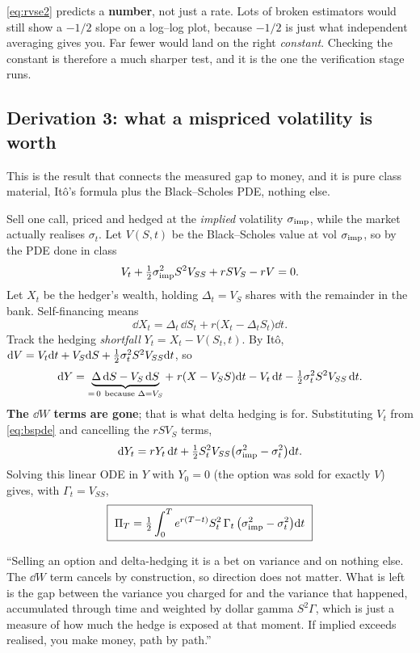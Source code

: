\documentclass[11pt,a4paper]{article}
\begin{document}
\begin{keybox}
\eqref{eq:rvse2} predicts a \textbf{number}, not just a rate. Lots of broken estimators would
still show a $-1/2$ slope on a log--log plot, because $-1/2$ is just what independent averaging
gives you. Far fewer would land on the right \emph{constant}. Checking the constant is
therefore a much sharper test, and it is the one the verification stage runs.
\end{keybox}

\subsection{Derivation 3: what a mispriced volatility is worth}

This is the result that connects the measured gap to money, and it is pure class material, It\^o's formula
plus the Black--Scholes PDE, nothing else.

Sell one call, priced and hedged at the \emph{implied} volatility $\sigma_{\mathrm{imp}}$, while the market
actually realises $\sigma_t$. Let $V(S,t)$ be the Black--Scholes value at vol $\sigma_{\mathrm{imp}}$, so by the
PDE done in class
\begin{equation}
V_t+\tfrac{1}{2}\sigma_{\mathrm{imp}}^2S^2V_{SS}+rSV_S-rV=0 .
\label{eq:bspde}
\end{equation}
Let $X_t$ be the hedger's wealth, holding $\Delta_t=V_S$ shares with the remainder in the bank.
Self-financing means
\[
\dd X_t=\Delta_t\,\dd S_t+r\big(X_t-\Delta_tS_t\big)\dd t .
\]
Track the hedging \emph{shortfall} $Y_t=X_t-V(S_t,t)$. By It\^o,
$\mathrm{d} V=V_t\mathrm{d} t+V_S\mathrm{d} S+\tfrac{1}{2}\sigma_t^2S^2V_{SS}\mathrm{d} t$, so
\[
\mathrm{d} Y=\underbrace{\Delta\,\mathrm{d} S-V_S\,\mathrm{d} S}_{=\,0\ \text{because }\Delta=V_S}
+\;r(X-V_SS)\mathrm{d} t-V_t\,\mathrm{d} t-\tfrac{1}{2}\sigma_t^2S^2V_{SS}\,\mathrm{d} t .
\]
\textbf{The $\dd W$ terms are gone}; that is what delta hedging is for. Substituting $V_t$
from \eqref{eq:bspde} and cancelling the $rSV_S$ terms,
\[
\mathrm{d} Y_t=rY_t\,\mathrm{d} t+\tfrac{1}{2} S_t^2V_{SS}\big(\sigma_{\mathrm{imp}}^2-\sigma_t^2\big)\mathrm{d} t .
\]
Solving this linear ODE in $Y$ with $Y_0=0$ (the option was sold for exactly $V$) gives, with
$\Gamma_t=V_{SS}$,
\begin{equation}
\boxed{\ \Pi_T=\tfrac{1}{2}\int_0^T e^{r(T-t)}S_t^2\,\Gamma_t\,\big(\sigma_{\mathrm{imp}}^2-\sigma_t^2\big)\mathrm{d} t\ }
\label{eq:pnl2}
\end{equation}

\begin{saybox}
``Selling an option and delta-hedging it is a bet on variance and on nothing else. The $\dd W$
term cancels by construction, so direction does not matter. What is left is the gap between the
variance you charged for and the variance that happened, accumulated through time and weighted
by dollar gamma $S^2\Gamma$, which is just a measure of how much the hedge is exposed at
that moment. If implied exceeds realised, you make money, path by path.''
\end{saybox}
\end{document}
